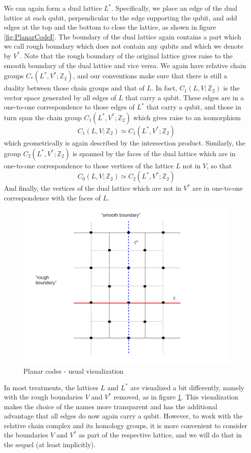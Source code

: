 \documentclass[a4paper, draft]{article}
\theoremstyle{own}
\theoremstyle{remark}
\newcommand{\Z}{\mathbb{Z}}
\begin{document}
We can again form a dual lattice $L^*$. Specifically, we place an edge of the dual lattice at each qubit, perpendicular to the edge supporting the qubit, and add edges at the top and the bottom to close the lattice, as shown in figure \ref{fig:PlanarCodeI}. The boundary of the dual lattice again contains a part which we call rough boundary which does not contain any qubits and which we denote by $V^*$. Note that the rough boundary of the original lattice gives raise to the smooth boundary of the dual lattice and vice versa. We again have relative chain groups $C_*(L^*,V^*;\Z_2)$, and our conventions make sure that there is still a duality between those chain groups and that of $L$. In fact, $C_1(L,V;\Z_2)$ is the vector space generated by all edges of $L$ that carry a qubit. These edges are in a one-to-one correspondence to those edges of $L^*$ that carry a qubit, and those in turn span the chain group $C_1(L^*,V^*;\Z_2)$ which gives raise to an isomorphism
$$
C_1(L,V;\Z_2) \simeq C_1(L^*,V^*;\Z_2)
$$
which geometrically is again described by the intersection product. Similarly, the group $C_2(L^*,V^*;\Z_2)$ is spanned by the faces of the dual lattice which are in one-to-one correspondence to those vertices of the lattice $L$ not in $V$, so that
$$
C_0(L,V;\Z_2) \simeq C_2(L^*,V^*;\Z_2)
$$
And finally, the vertices of the dual lattice which are not in $V^*$ are in one-to-one correspondence with the faces of $L$.



\begin{figure}[ht]
\centering
\includegraphics[width=0.7\linewidth]{images/PlanarCodeII}
\caption[Planar codes - usual visualization]{Planar codes - usual visualization}
\label{fig:PlanarCodeII}
\end{figure}


In most treatments, the lattices $L$ and $L^*$ are visualized a bit differently, namely with the rough boundaries $V$ and $V^*$ removed, as in figure \ref{fig:PlanarCodeII}. This visualization makes the choice of the names more transparent and has the additional advantage that all edges do now again carry a qubit. However, to work with the relative chain complex and its homology groups, it is more convenient to consider the boundaries $V$ and $V^*$ as part of the respective lattice, and we will do that in the sequel (at least implicitly). 
\end{document}
